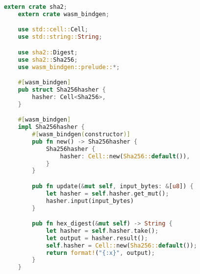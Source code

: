 \begin{lstlisting}[language=Rust]
    extern crate sha2;
    extern crate wasm_bindgen;

    use std::cell::Cell;
    use std::string::String;

    use sha2::Digest;
    use sha2::Sha256;
    use wasm_bindgen::prelude::*;

    #[wasm_bindgen]
    pub struct Sha256hasher {
        hasher: Cell<Sha256>,
    }

    #[wasm_bindgen]
    impl Sha256hasher {
        #[wasm_bindgen(constructor)]
        pub fn new() -> Sha256hasher {
            Sha256hasher {
                hasher: Cell::new(Sha256::default()),
            }
        }

        pub fn update(&mut self, input_bytes: &[u8]) {
            let hasher = self.hasher.get_mut();
            hasher.input(input_bytes)
        }

        pub fn hex_digest(&mut self) -> String {
            let hasher = self.hasher.take();
            let output = hasher.result();
            self.hasher = Cell::new(Sha256::default());
            return format!("{:x}", output);
        }
    }
\end{lstlisting}


